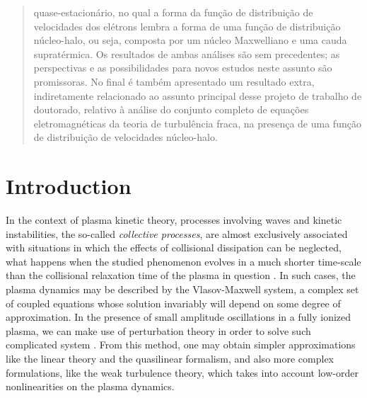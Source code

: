\documentclass[12pt,a4paper,ruledheader]{report}
\begin{document}
\begin{otherlanguage}{brazilian}
\begin{abstract}
    quase-estacionário, no qual a forma da função de distribuição de velocidades
    dos elétrons lembra a forma de uma função de distribuição núcleo-halo, ou
    seja, composta por um núcleo Maxwelliano e uma cauda supratérmica. Os
    resultados de ambas análises são sem precedentes; as perspectivas e as
    possibilidades para novos estudos neste assunto são promissoras. No final é
    também apresentado um resultado extra, indiretamente relacionado ao assunto
    principal desse projeto de trabalho de doutorado, relativo à análise do
    conjunto completo de equações eletromagnéticas da teoria de turbulência
    fraca, na presença de uma função de distribuição de velocidades núcleo-halo. 
   \end{abstract}
\end{otherlanguage}
% 
\tableofcontents{\thispagestyle{empty}}
\listoffigures{\thispagestyle{empty}}
\pagestyle{fancy}
\fancyhf{}
\renewcommand{\headrulewidth}{0.5pt}
\lhead{\nouppercase{\it \leftmark}}
\rhead{\thepage}
\setcounter{page}{0}
\chapter{Introduction}
\label{cha:intro}

In the context of plasma kinetic theory, processes involving waves
and kinetic instabilities, the so-called \emph{collective processes},
are almost exclusively associated with situations in which the effects
of collisional dissipation can be neglected, what happens when the
studied phenomenon evolves in a much shorter time-scale than the
collisional relaxation time of the plasma in question \cite{akhi1967}.
In such cases, the plasma dynamics may be described by the Vlasov-Maxwell
system, a complex set of coupled equations whose solution invariably will
depend on some degree of approximation. In the presence of small
amplitude oscillations in a fully ionized plasma, we can make use
of perturbation theory in order to solve such complicated system
\cite{klimo}. From this method, one may obtain simpler approximations
like the linear theory and the quasilinear formalism, and also
more complex formulations, like the weak turbulence theory, which
takes into account low-order nonlinearities on the plasma dynamics.
\end{document}

